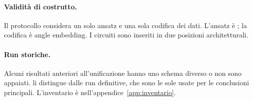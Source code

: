\paragraph{Validità di costrutto.}
Il protocollo considera un solo ansatz e una sola codifica dei dati. L'ansatz è
; la codifica è angle embedding. I circuiti sono
inseriti in due posizioni architetturali.

\paragraph{Run storiche.} Alcuni risultati anteriori all'unificazione hanno uno
schema diverso o non sono appaiati.  li distingue dalle run
definitive, che sono le sole usate per le conclusioni principali. L'inventario è
nell'appendice~\ref{app:inventario}.
